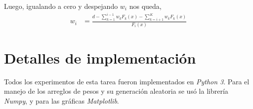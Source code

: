 \documentclass[a4paper]{article}
\begin{document}
Luego, igualando a cero y despejando $w_{i}$ nos queda,
\begin{align*}
w_{i} &= \frac{d - \sum_{k=1}^{i-1}w_{k}F_{k}(x) - \sum_{k=i+1}^{K}w_{k}F_{k}(x)}{F_{i}(x)}
\end{align*}

\section{Detalles de implementación}
Todos los experimentos de esta tarea fueron implementados en \textit{Python 3}. Para el manejo de los arreglos de pesos y su generación aleatoria se usó la librería \textit{Numpy}, y para las gráficas \textit{Matplotlib}. 
\end{document}
